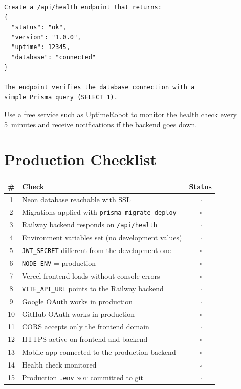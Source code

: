 \begin{praticabox}[title={Practice --- Health check}]
\begin{lstlisting}[language={}]
Create a /api/health endpoint that returns:
{
  "status": "ok",
  "version": "1.0.0",
  "uptime": 12345,
  "database": "connected"
}

The endpoint verifies the database connection with a
simple Prisma query (SELECT 1).
\end{lstlisting}
\end{praticabox}

Use a free service such as UptimeRobot to monitor the health check every 5~minutes and receive notifications if the backend goes down.

\section{Production Checklist}

\begin{praticabox}[title={Practice --- Full verification}]
\begin{center}
\begin{small}
\begin{tabularx}{\textwidth}{c X c}
\toprule
\textbf{\#} & \textbf{Check} & \textbf{Status} \\
\midrule
1 & Neon database reachable with SSL & $\square$ \\
2 & Migrations applied with \texttt{prisma migrate deploy} & $\square$ \\
3 & Railway backend responds on \texttt{/api/health} & $\square$ \\
4 & Environment variables set (no development values) & $\square$ \\
5 & \texttt{JWT\_SECRET} different from the development one & $\square$ \\
6 & \texttt{NODE\_ENV} = production & $\square$ \\
7 & Vercel frontend loads without console errors & $\square$ \\
8 & \texttt{VITE\_API\_URL} points to the Railway backend & $\square$ \\
9 & Google OAuth works in production & $\square$ \\
10 & GitHub OAuth works in production & $\square$ \\
11 & CORS accepts only the frontend domain & $\square$ \\
12 & HTTPS active on frontend and backend & $\square$ \\
13 & Mobile app connected to the production backend & $\square$ \\
14 & Health check monitored & $\square$ \\
15 & Production \texttt{.env} \textsc{not} committed to git & $\square$ \\
\bottomrule
\end{tabularx}
\end{small}
\end{center}
\end{praticabox}

